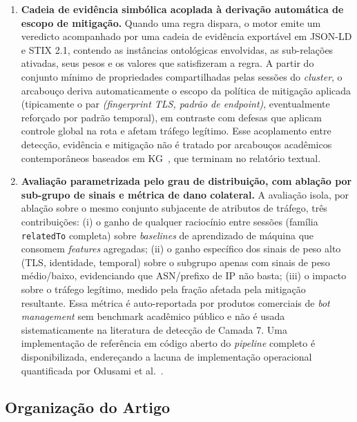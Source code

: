 \documentclass[preprint,12pt]{elsarticle}
\begin{document}
\begin{enumerate}
    \item \textbf{Cadeia de evidência simbólica acoplada à derivação automática de escopo de mitigação.} Quando uma regra dispara, o motor emite um veredicto acompanhado por uma cadeia de evidência exportável em JSON-LD e STIX 2.1, contendo as instâncias ontológicas envolvidas, as sub-relações ativadas, seus pesos e os valores que satisfizeram a regra. A partir do conjunto mínimo de propriedades compartilhadas pelas sessões do \emph{cluster}, o arcabouço deriva automaticamente o escopo da política de mitigação aplicada (tipicamente o par \emph{(fingerprint TLS, padrão de endpoint)}, eventualmente reforçado por padrão temporal), em contraste com defesas que aplicam controle global na rota e afetam tráfego legítimo. Esse acoplamento entre detecção, evidência e mitigação não é tratado por arcabouços acadêmicos contemporâneos baseados em KG~\cite{belcastro2025klage}, que terminam no relatório textual.

    \item \textbf{Avaliação parametrizada pelo grau de distribuição, com ablação por sub-grupo de sinais e métrica de dano colateral.} A avaliação isola, por ablação sobre o mesmo conjunto subjacente de atributos de tráfego, três contribuições: (i) o ganho de qualquer raciocínio entre sessões (família \texttt{relatedTo} completa) sobre \emph{baselines} de aprendizado de máquina que consomem \emph{features} agregadas; (ii) o ganho específico dos sinais de peso alto (TLS, identidade, temporal) sobre o subgrupo apenas com sinais de peso médio/baixo, evidenciando que ASN/prefixo de IP não basta; (iii) o impacto sobre o tráfego legítimo, medido pela fração afetada pela mitigação resultante. Essa métrica é auto-reportada por produtos comerciais de \emph{bot management} sem benchmark acadêmico público e não é usada sistematicamente na literatura de detecção de Camada 7. Uma implementação de referência em código aberto do \emph{pipeline} completo é disponibilizada, endereçando a lacuna de implementação operacional quantificada por Odusami et al.~\cite{odusami2020survey}.
\end{enumerate}

\subsection{Organização do Artigo}
\end{document}
